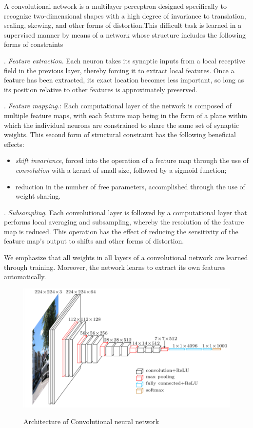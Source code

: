 \documentclass[12pt]{article}
\begin{document}
    A convolutional network is a multilayer perceptron designed specifically to recognize
two-dimensional shapes with a high degree of invariance to translation, scaling, skewing, and other forms of distortion.This difficult task is learned in a supervised manner by means of a network whose structure includes the following forms of constraints
  
. \textit{Feature extraction}. Each neuron takes its synaptic inputs from a local receptive
field in the previous layer, thereby forcing it to extract local features. Once a feature
has been extracted, its exact location becomes less important, so long as its position relative
to other features is approximately preserved.

    . \textit{Feature mapping.}: Each computational layer of the network is composed of multiple feature maps, with each feature map being in the form of a plane within which the individual neurons are constrained to share the same set of synaptic weights. This second form of structural constraint has the following beneficial effects:
    \begin{itemize}
  \item \textit{shift invariance}, forced into the operation of a feature map through the use of \textit{convolution} with a kernel of small size, followed by a sigmoid function;
  \item reduction in the number of free parameters, accomplished through the use of weight sharing.
\end{itemize}
    
    . \textit{Subsampling}. Each convolutional layer is followed by a computational layer that performs local averaging and subsampling, whereby the resolution of the feature map is reduced. This operation has the effect of reducing the sensitivity of the feature map’s output to shifts and other forms of distortion.
    
    We emphasize that all weights in all layers of a convolutional network are learned through training. Moreover, the network learns to extract its own features automatically.
    
    \begin{figure}[h]
    	\centering
    	\includegraphics[width=0.75 \textwidth]{cnn.png}
       	\label{fig:mesh8}
	\caption{Architecture of Convolutional neural network }
	\end{figure} 
    
\end{document}
